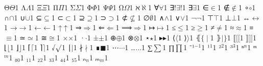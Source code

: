 {    {Θ}{{\ensuremath{\Theta}}}1
    {Λ}{{\ensuremath{\Lambda}}}1
    {Ξ}{{\ensuremath{\Xi}}}1
    {Π}{{\ensuremath{\Pi}}}1
    {Σ}{{\ensuremath{\Sigma}}}1
    {Φ}{{\ensuremath{\Phi}}}1
    {Ψ}{{\ensuremath{\Psi}}}1
    {Ω}{{\ensuremath{\Omega}}}1
    {ℵ}{{\ensuremath{\aleph}}}1
    {∀}{{\ensuremath{\forall}}}1
    {∃!}{{\ensuremath{\exists}!}}1
    {∃}{{\ensuremath{\exists}}}1
    {∈}{{\ensuremath{\in}}}1
    {∉}{{\ensuremath{\notin}}}1
    {∘}{{\ensuremath{\circ}}}1
    {∩}{{\ensuremath{\cap}}}1
    {∪}{{\ensuremath{\cup}}}1
    {⊆}{{\ensuremath{\subseteq}}}1
    {⊂}{{\ensuremath{\subset}}}1
    {⊇}{{\ensuremath{\supseteq}}}1
    {⊃}{{\ensuremath{\supset}}}1
    {⊄}{{\ensuremath{\nsubseteq}}}1
    {∅}{{\ensuremath{\emptyset}}}1
    {∧}{{\ensuremath{\wedge}}}1
    {∨}{{\ensuremath{\vee}}}1
    {¬}{{\ensuremath{\neg}}}1
    {⊤}{{\ensuremath{\top}}}1
    {⊥}{{\ensuremath{\bot}}}1
    {↔}{{\ensuremath{\leftrightarrow}}}1
    {→}{{\ensuremath{\rightarrow}}}1
    {←}{{\ensuremath{\leftarrow}}}1
    {↑}{{\ensuremath{\uparrow}}}1
    {⇒}{{\ensuremath{\Rightarrow}}}1
    {⇐}{{\ensuremath{\Leftarrow}}}1
    {⟹}{{\ensuremath{\Longrightarrow}}}1
    {↦}{{\ensuremath{\mapsto}}}1
    {≤}{{\ensuremath{\leq}}}1
    {≥}{{\ensuremath{\geq}}}1
    {≠}{{\ensuremath{\neq}}}1
    {≈}{{\ensuremath{\approx}}}1
    {≡}{{\ensuremath{\equiv}}}1
    {≃}{{\ensuremath{\simeq}}}1
    {≅}{{\ensuremath{\cong}}}1
    {×}{{\ensuremath{\times}}}1
    {·}{{\ensuremath{\cdot}}}1
    {±}{{\ensuremath{\pm}}}1
    {⊕}{{\ensuremath{\oplus}}}1
    {⊗}{{\ensuremath{\otimes}}}1
    {⋆}{{\ensuremath{\star}}}1
    {▸}{{\ensuremath{\blacktriangleright}}}1
    {⟨}{{\ensuremath{\langle}}}1
    {⟩}{{\ensuremath{\rangle}}}1
    {⦃}{{\ensuremath{\{\!\mid}}}1
    {⦄}{{\ensuremath{\mid\!\}}}}1
    {⟦}{{\ensuremath{[\![}}}1
    {⟧}{{\ensuremath{]\!]}}}1
    {⌊}{{\ensuremath{\lfloor}}}1
    {⌋}{{\ensuremath{\rfloor}}}1
    {⌈}{{\ensuremath{\lceil}}}1
    {⌉}{{\ensuremath{\rceil}}}1
    {√}{{\ensuremath{\surd}}}1
    {∣}{{\ensuremath{\mid}}}1
    {∤}{{\ensuremath{\nmid}}}1
    {∎}{{\ensuremath{\blacksquare}}}1
    {⋯}{{\ensuremath{\cdots}}}1
    {…}{{\ensuremath{\ldots}}}1
    {∑}{{\ensuremath{\sum}}}1
    {∏}{{\ensuremath{\prod}}}1
    {⁻¹}{{\ensuremath{^{-1}}}}1
    {¹}{{\ensuremath{^1}}}1
    {²}{{\ensuremath{^2}}}1
    {³}{{\ensuremath{^3}}}1
    {ⁿ}{{\ensuremath{^n}}}1
    {ᵐ}{{\ensuremath{^m}}}1
    {₀}{{\ensuremath{_0}}}1
    {₁}{{\ensuremath{_1}}}1
    {₂}{{\ensuremath{_2}}}1
    {₃}{{\ensuremath{_3}}}1
    {₄}{{\ensuremath{_4}}}1
    {₅}{{\ensuremath{_5}}}1
    {ₙ}{{\ensuremath{_n}}}1
    {ₘ}{{\ensuremath{_m}}}1
}
